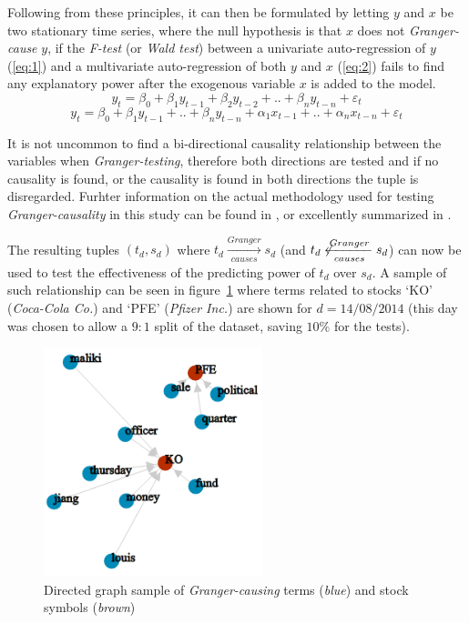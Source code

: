 \documentclass[conference,11pt]{IEEEtran}
\begin{document}
\par
Following from these principles, it can then be formulated by letting \(y\) and \(x\) be two stationary time series, where the null hypothesis is that \(x\) does not \textit{Granger-cause} \(y\), if the \textit{F-test} (or \textit{Wald test}) between a univariate auto-regression of \(y\) (\ref{eq:1}) and a multivariate auto-regression of both \(y\) and \(x\) (\ref{eq:2}) fails to find any explanatory power after the exogenous variable \(x\) is added to the model.
\begin{equation}
\label{eq:1}
y_t=\beta_0 + \beta_1 y_{t-1} + \beta_2 y_{t-2} + .. + \beta_n y_{t-n} + \varepsilon_t
\end{equation}
\begin{equation}
\label{eq:2}
y_t=\beta_0 + \beta_1 y_{t-1} + .. + \beta_n y_{t-n} + 
\alpha_1 x_{t-1} + .. + \alpha_n x_{t-n}
+ \varepsilon_t
\end{equation}

\par
It is not uncommon to find a bi-directional causality relationship between the variables when \textit{Granger-testing}, therefore both directions are tested and if no causality is found, or the causality is found in both directions the tuple is disregarded. Furhter information on the actual methodology used for testing \textit{Granger-causality} in this study can be found in \citep{Toda1995}, or excellently summarized in \citep{Giles2011}.

\par
The resulting tuples \((t_d, s_d)\) where \(t_d \xrightarrow[causes]{Granger} s_d\) (and \(t_d \not\xleftarrow[causes]{Granger} s_d\)) can now be used to test the effectiveness of the predicting power of \(t_d\) over \(s_d\). A sample of such relationship can be seen in figure~\ref{fig:term_stocks} where terms related to stocks `KO' (\textit{Coca-Cola Co.}) and `PFE' (\textit{Pfizer Inc.}) are shown for \(d=14/08/2014\) (this day was chosen to allow a \(9:1\) split of the dataset, saving \(10\%\) for the tests).

\begin{figure}[!htbp]
\centering
\includegraphics[width=2.5in]{force_20140814_small}
\caption{Directed graph sample of \textit{Granger-causing} terms (\textit{blue}) and stock symbols (\textit{brown})}
\label{fig:term_stocks}
\end{figure}
\end{document}
